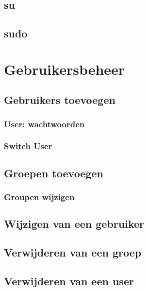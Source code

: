 \documentclass[a4paper,12pt,twoside,openright,titlepage]{book}
\begin{document}
\section{su}

\section{sudo}

\chapter{Gebruikersbeheer}
\section{Gebruikers toevoegen}

\subsection{User: wachtwoorden}

\subsection{Switch User}

\section{Groepen toevoegen}

\subsection{Groupen wijzigen}

\section{Wijzigen van een gebruiker}

\section{Verwijderen van een groep}

\section{Verwijderen van een user}


\backmatter
\printindex
\end{document}
